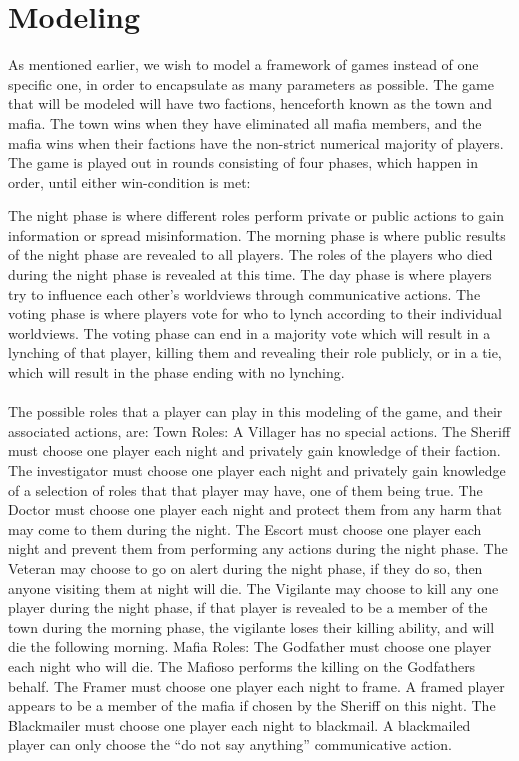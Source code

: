 \section{Modeling}
As mentioned earlier, we wish to model a framework of games instead of one
specific one, in order to encapsulate as many parameters as possible. The game
that will be modeled will have two factions, henceforth known as the town and
mafia. The town wins when they have eliminated all mafia members, and the mafia
wins when their factions have the non-strict numerical majority of players. The
game is played out in rounds consisting of four phases, which happen in order,
until either win-condition is met:

The night phase is where different roles perform private or public actions to
gain information or spread misinformation. The morning phase is where public
results of the night phase are revealed to all players. The roles of the
players who died during the night phase is revealed at this time. The day phase
is where players try to influence each other's worldviews through communicative
actions. The voting phase is where players vote for who to lynch according to
their individual worldviews. The voting phase can end in a majority vote which
will result in a lynching of that player, killing them and revealing their role
publicly, or in a tie, which will result in the phase ending with no lynching.
\\ \\ The possible roles that a player can play in this modeling of the game,
and their associated actions, are: Town Roles: A Villager has no special
actions. The Sheriff must choose one player each night and privately gain
knowledge of their faction. The investigator must choose one player each night
and privately gain knowledge of a selection of roles that that player may have,
one of them being true. The Doctor must choose one player each night and
protect them from any harm that may come to them during the night. The Escort
must choose one player each night and prevent them from performing any actions
during the night phase. The Veteran may choose to go on alert during the night
phase, if they do so, then anyone visiting them at night will die. The
Vigilante may choose to kill any one player during the night phase, if that
player is revealed to be a member of the town during the morning phase, the
vigilante loses their killing ability, and will die the following morning.
Mafia Roles: The Godfather must choose one player each night who will die. The
Mafioso performs the killing on the Godfathers behalf. The Framer must choose
one player each night to frame. A framed player appears to be a member of the
mafia if chosen by the Sheriff on this night. The Blackmailer must choose one
player each night to blackmail. A blackmailed player can only choose the “do
not say anything” communicative action.

